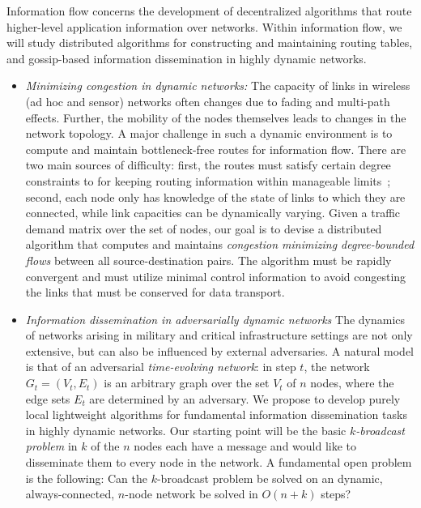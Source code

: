 Information flow concerns the development of decentralized algorithms
that route higher-level application information over networks.  Within
information flow, we will study distributed algorithms for
constructing and maintaining routing tables, and gossip-based
information dissemination in highly dynamic networks.

\begin{itemize}
\item
{\sl Minimizing congestion in dynamic networks:} The capacity of links
in wireless (ad hoc and sensor) networks often changes due to fading
and multi-path effects.  Further, the mobility of the nodes themselves
leads to changes in the network topology.  A major challenge in such a
dynamic environment is to compute and maintain bottleneck-free routes
for information flow.  There are two main sources of difficulty:
first, the routes must satisfy certain degree constraints to for
keeping routing information within manageable limits~\cite{xxx};
second, each node only has knowledge of the state of links to which
they are connected, while link capacities can be dynamically varying.
Given a traffic demand matrix over the set of nodes, our goal is to
devise a distributed algorithm that computes and maintains {\em
  congestion minimizing degree-bounded flows}\/ between all
source-destination pairs.  The algorithm must be rapidly convergent
and must utilize minimal control information to avoid congesting the
links that must be conserved for data transport.

\item
{\sl Information dissemination in adversarially dynamic networks} The
dynamics of networks arising in military and critical infrastructure
settings are not only extensive, but can also be influenced by
external adversaries.  A natural model is that of an adversarial {\em
  time-evolving network}: in step $t$, the network $G_t = (V_t, E_t)$
is an arbitrary graph over the set $V_t$ of $n$ nodes, where the edge
sets $E_t$ are determined by an adversary.  We propose to develop
purely local lightweight algorithms for fundamental information
dissemination tasks in highly dynamic networks.  Our starting point
will be the basic {\em $k$-broadcast problem} in $k$ of the $n$ nodes
each have a message and would like to disseminate them to every node
in the network.  A fundamental open problem is the following: Can the
$k$-broadcast problem be solved on an dynamic, always-connected,
$n$-node network be solved in $O(n + k)$ steps?
\end{itemize}

